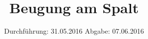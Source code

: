

\subject{V406}
\title{Beugung am Spalt}
\date{
  Durchführung: 31.05.2016
  \hspace{3em}
  Abgabe: 07.06.2016
}



\maketitle
\thispagestyle{empty}
\tableofcontents
\newpage







\printbibliography


